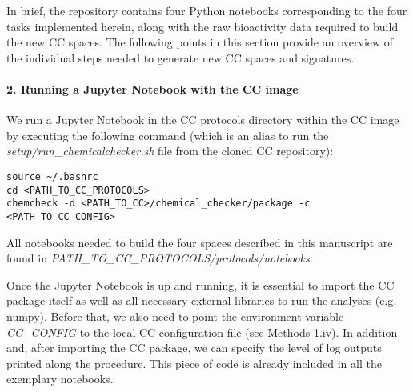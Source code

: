In brief, the repository contains four Python notebooks corresponding to the four tasks implemented herein, along with the raw bioactivity data required to build the new CC spaces. The following points in this section provide an overview of the individual steps needed to generate new CC spaces and signatures.




\paragraph{2. Running a Jupyter Notebook with the CC image} \leavevmode

We run a Jupyter Notebook in the CC protocols directory within the CC image by executing the following command (which is an alias to run the \textit{setup/run\_chemicalchecker.sh} file from the cloned CC repository): \\

\begin{lstlisting}
source ~/.bashrc
cd <PATH_TO_CC_PROTOCOLS>
chemcheck -d <PATH_TO_CC>/chemical_checker/package -c <PATH_TO_CC_CONFIG>
\end{lstlisting}

All notebooks needed to build the four spaces described in this manuscript are found in \textit{PATH\_TO\_CC\_PROTOCOLS/protocols/notebooks}.

Once the Jupyter Notebook is up and running, it is essential to import the CC package itself as well as all necessary external libraries to run the analyses (e.g. numpy). Before that, we also need to point the environment variable \textit{CC\_CONFIG} to the local CC configuration file (see \hyperref[Protocols_Methods]{Methods} 1.iv). In addition and, after importing the CC package, we can specify the level of log outputs printed along the procedure. This piece of code is already included in all the exemplary notebooks. \\

